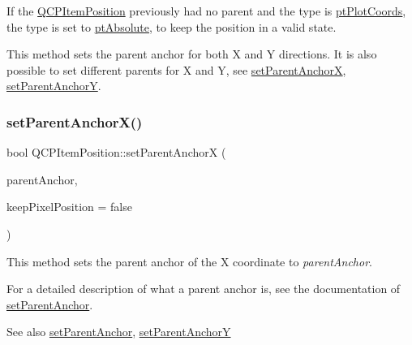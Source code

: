 If the \mbox{\hyperlink{class_q_c_p_item_position}{Q\+C\+P\+Item\+Position}} previously had no parent and the type is \mbox{\hyperlink{class_q_c_p_item_position_aad9936c22bf43e3d358552f6e86dbdc8ad5ffb8dc99ad73263f7010c77342294c}{pt\+Plot\+Coords}}, the type is set to \mbox{\hyperlink{class_q_c_p_item_position_aad9936c22bf43e3d358552f6e86dbdc8a564f5e53e550ead1ec5fc7fc7d0b73e0}{pt\+Absolute}}, to keep the position in a valid state.

This method sets the parent anchor for both X and Y directions. It is also possible to set different parents for X and Y, see \mbox{\hyperlink{class_q_c_p_item_position_add71461a973927c74e42179480916d9c}{set\+Parent\+AnchorX}}, \mbox{\hyperlink{class_q_c_p_item_position_add5ec1db9d19cec58a3b5c9e0a0c3f9d}{set\+Parent\+AnchorY}}. \mbox{\label{class_q_c_p_item_position_add71461a973927c74e42179480916d9c}} 
\subsubsection{\texorpdfstring{setParentAnchorX()}{setParentAnchorX()}}
{\footnotesize\ttfamily bool Q\+C\+P\+Item\+Position\+::set\+Parent\+AnchorX (\begin{DoxyParamCaption}\item[{\mbox{\hyperlink{class_q_c_p_item_anchor}{Q\+C\+P\+Item\+Anchor}} $\ast$}]{parent\+Anchor,  }\item[{bool}]{keep\+Pixel\+Position = {\ttfamily false} }\end{DoxyParamCaption})}

This method sets the parent anchor of the X coordinate to {\itshape parent\+Anchor}.

For a detailed description of what a parent anchor is, see the documentation of \mbox{\hyperlink{class_q_c_p_item_position_ac094d67a95d2dceafa0d50b9db3a7e51}{set\+Parent\+Anchor}}.

\begin{DoxySeeAlso}{See also}
\mbox{\hyperlink{class_q_c_p_item_position_ac094d67a95d2dceafa0d50b9db3a7e51}{set\+Parent\+Anchor}}, \mbox{\hyperlink{class_q_c_p_item_position_add5ec1db9d19cec58a3b5c9e0a0c3f9d}{set\+Parent\+AnchorY}} 
\end{DoxySeeAlso}
\mbox{\label{class_q_c_p_item_position_add5ec1db9d19cec58a3b5c9e0a0c3f9d}} 
